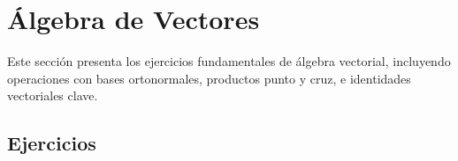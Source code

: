 \section{Álgebra de Vectores}

Este sección presenta los ejercicios fundamentales de álgebra vectorial,
incluyendo operaciones con bases ortonormales, productos punto y cruz,
e identidades vectoriales clave.

\subsection{Ejercicios}


\clearpage

\clearpage

\clearpage

\clearpage

\clearpage

